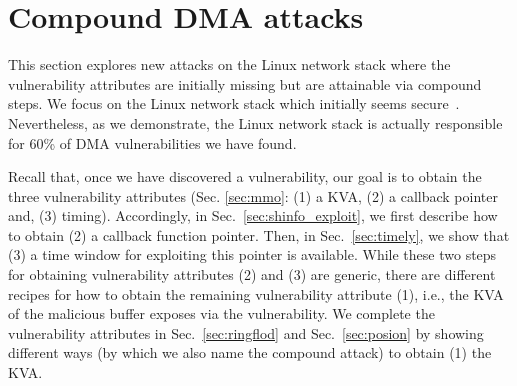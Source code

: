 \section{Compound DMA attacks}\label{sec:linux_net}



This section explores new attacks on the Linux network stack where the vulnerability attributes are initially missing but are attainable via compound steps.
We focus on the Linux network stack which initially seems secure~\cite{thunder}.
Nevertheless, as we demonstrate, the Linux network stack is actually responsible for 60\% of DMA vulnerabilities we have found.

Recall that, once we have discovered a \subpage{} vulnerability, our goal is to obtain the three vulnerability attributes (Sec. \ref{sec:mmo}: (1) a KVA, (2) a callback pointer and, (3) timing). 
Accordingly, in Sec.~\ref{sec:shinfo_exploit}, we first describe how to obtain (2) a callback function pointer. Then, in Sec.~\ref{sec:timely}, we show that (3) a time window for exploiting this pointer is available. 
While these two steps for obtaining vulnerability attributes (2) and (3) are generic, there are different recipes for how to obtain the remaining vulnerability attribute (1), i.e., the KVA of the malicious buffer exposes via the \subpage{} vulnerability. 
We complete the vulnerability attributes in Sec.~\ref{sec:ringflod} and Sec.~\ref{sec:posion} by showing different ways (by which we also name the compound attack) to obtain (1) the KVA.



